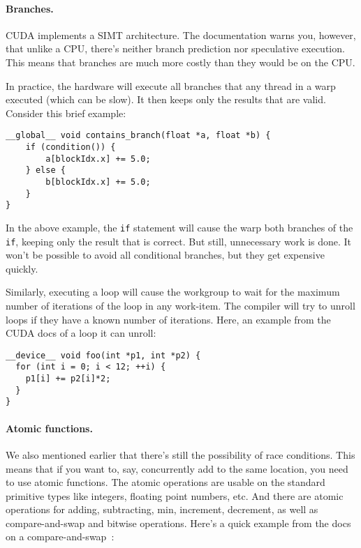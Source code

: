 \paragraph{Branches.} CUDA implements a SIMT architecture. The documentation warns you, however, that unlike a CPU, there's neither branch prediction nor speculative execution. This means that branches are much more costly than they would be on the CPU. 

In practice, the hardware will execute all branches that any thread in
a warp executed (which can be slow). It then keeps only the results that are valid. Consider this brief example:

    \begin{verbatim}
__global__ void contains_branch(float *a, float *b) {
    if (condition()) {
        a[blockIdx.x] += 5.0;
    } else {
        b[blockIdx.x] += 5.0;
    }
}
\end{verbatim}

In the above example, the {\tt if} statement will cause
the warp both branches of the {\tt if}, keeping only the
result that is correct. But still, unnecessary work is done. It won't be possible to avoid all conditional branches, but they get expensive quickly.

Similarly, executing a loop will cause the
workgroup to wait for the maximum number of iterations of the loop in
any work-item. The compiler will try to unroll loops if they have a known number of iterations. Here, an example from the CUDA docs of a loop it can unroll:

{\scriptsize \hspace*{2em} \begin{minipage}{.5\textwidth}
    \begin{lstlisting}
__device__ void foo(int *p1, int *p2) {
  for (int i = 0; i < 12; ++i) {
    p1[i] += p2[i]*2;
  }
}
    \end{lstlisting}
\end{minipage} }

\paragraph{Atomic functions.}

We also mentioned earlier that there's still the possibility of race conditions. This means that if you want to, say, concurrently add to the same location, you need to use atomic functions. The atomic operations are usable on the standard primitive types like integers, floating point numbers, etc. And there are atomic operations for adding, subtracting, min, increment, decrement, as well as compare-and-swap and bitwise operations. Here's a quick example from the docs on a compare-and-swap~\cite{cuda}:

